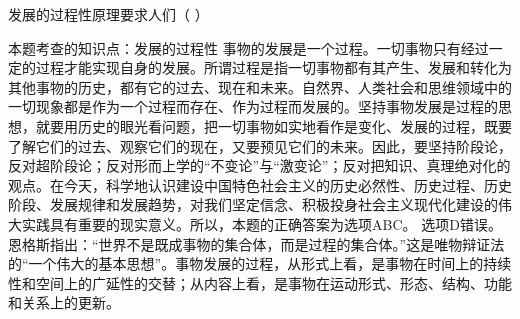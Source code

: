 \question 发展的过程性原理要求人们（ ）
\par{}
\begin{solution}本题考查的知识点：发展的过程性
事物的发展是一个过程。一切事物只有经过一定的过程才能实现自身的发展。所谓过程是指一切事物都有其产生、发展和转化为其他事物的历史，都有它的过去、现在和未来。自然界、人类社会和思维领域中的一切现象都是作为一个过程而存在、作为过程而发展的。坚持事物发展是过程的思想，就要用历史的眼光看问题，把一切事物如实地看作是变化、发展的过程，既要了解它们的过去、观察它们的现在，又要预见它们的未来。因此，要坚持阶段论，反对超阶段论；反对形而上学的``不变论''与``激变论''；反对把知识、真理绝对化的观点。在今天，科学地认识建设中国特色社会主义的历史必然性、历史过程、历史阶段、发展规律和发展趋势，对我们坚定信念、积极投身社会主义现代化建设的伟大实践具有重要的现实意义。所以，本题的正确答案为选项ABC。
选项D错误。恩格斯指出：``世界不是既成事物的集合体，而是过程的集合体。''这是唯物辩证法的``一个伟大的基本思想''。事物发展的过程，从形式上看，是事物在时间上的持续性和空间上的广延性的交替；从内容上看，是事物在运动形式、形态、结构、功能和关系上的更新。
\end{solution}
